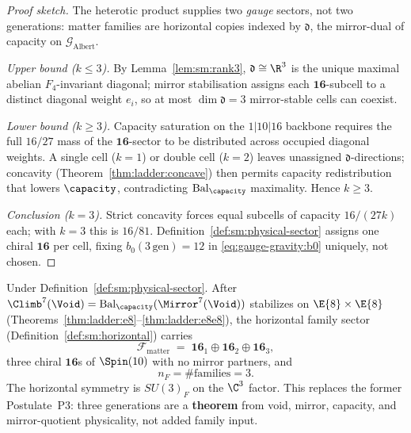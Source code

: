 \begin{proof}[Proof sketch]
The heterotic product supplies two \emph{gauge} sectors, not two generations:
matter families are horizontal copies indexed by $\mathfrak{d}$, the
mirror-dual of capacity on $\mathcal{G}_{\mathrm{Albert}}$.

\emph{Upper bound ($k\leq3$).}
By Lemma~\ref{lem:sm:rank3}, $\mathfrak{d}\cong\R^3$ is the unique maximal
abelian $F_4$-invariant diagonal; mirror stabilisation assigns each
$\mathbf{16}$-subcell to a distinct diagonal weight $e_i$, so at most
$\dim\mathfrak{d}=3$ mirror-stable cells can coexist.

\emph{Lower bound ($k\geq3$).}
Capacity saturation on the $1|10|16$ backbone requires the full
$16/27$ mass of the $\mathbf{16}$-sector to be distributed across occupied
diagonal weights. A single cell ($k=1$) or double cell ($k=2$) leaves
unassigned $\mathfrak{d}$-directions; concavity
(Theorem~\ref{thm:ladder:concave}) then permits capacity redistribution that
lowers $\capacity$, contradicting $\mathrm{Bal}_\capacity$ maximality.
Hence $k\geq3$.

\emph{Conclusion ($k=3$).}
Strict concavity forces equal subcells of capacity $16/(27k)$ each; with
$k=3$ this is $16/81$. Definition~\ref{def:sm:physical-sector} assigns one chiral
$\mathbf{16}$ per cell, fixing $b_0(3\,\mathrm{gen})=12$ in
\eqref{eq:gauge-gravity:b0} uniquely, not chosen.
\end{proof}

\begin{theorem}\label{thm:sm:three-families}
Under Definition~\ref{def:sm:physical-sector}. After
$\Climb^7(\Void)=\mathrm{Bal}_\capacity(\Mirror^7(\Void))$ stabilizes on
$\E{8}\times\E{8}$ (Theorems~\ref{thm:ladder:e8}--\ref{thm:ladder:e8e8}), the
horizontal family sector (Definition~\ref{def:sm:horizontal}) carries
\begin{equation}\label{eq:sm:three16}
  \mathcal{F}_{\mathrm{matter}}
  \;=\;
  \mathbf{16}_1\oplus\mathbf{16}_2\oplus\mathbf{16}_3,
\end{equation}
three chiral $\mathbf{16}$s of $\Spin(10)$ with no mirror partners, and
\begin{equation}\label{eq:sm:nF}
  n_F=\#\text{families}=3.
\end{equation}
The horizontal symmetry is $SU(3)_F$ on the $\C^3$ factor. This replaces the
former Postulate~P3: three generations are a \textbf{theorem} from void, mirror,
capacity, and mirror-quotient physicality, not added family input.
\end{theorem}

